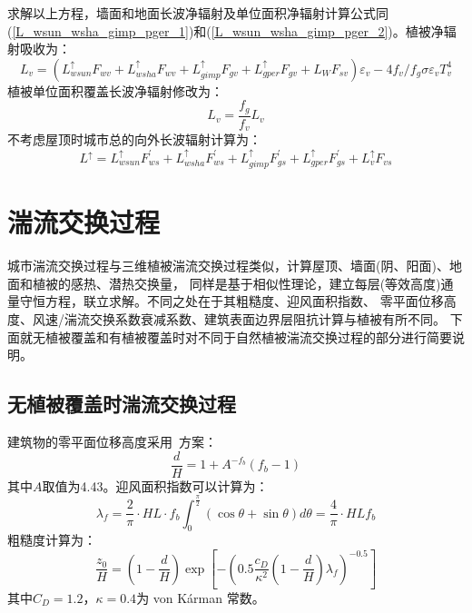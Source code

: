 求解以上方程，墙面和地面长波净辐射及单位面积净辐射计算公式同(\ref{L_wsun_wsha_gimp_pger_1})和(\ref{L_wsun_wsha_gimp_pger_2})。植被净辐射吸收为：
\begin{equation}
L_{v}=\left(L_{wsun}^{\uparrow} F_{w v}+L_{wsha}^{\uparrow} F_{w v}+L_{gimp}^{\uparrow} F_{g v}+L_{gper}^{\uparrow} F_{g v}+L_{W} F_{s v}\right) \varepsilon_{v}-4 f_{v} / f_{g} \sigma \varepsilon_{v} T_{v}^{4}
\end{equation}
植被单位面积覆盖长波净辐射修改为：
\begin{equation}
L_{v}=\frac{f_{g}}{f_{v}} L_{v}
\end{equation}
不考虑屋顶时城市总的向外长波辐射计算为：
\begin{equation}
L^{\uparrow}=L_{wsun}^{\uparrow} F_{ws}^{\prime}+L_{wsha}^{\uparrow} F_{ws}^{\prime}+L_{gimp}^{\uparrow} F_{gs}^{\prime}+L_{gper}^{\uparrow} F_{gs}^{\prime}+L_{v}^{\uparrow} F_{v s}
\end{equation}
\section{湍流交换过程}
城市湍流交换过程与三维植被湍流交换过程类似，计算屋顶、墙面(阴、阳面)、地面和植被的感热、潜热交换量，
同样是基于相似性理论，建立每层(等效高度)通量守恒方程，联立求解。不同之处在于其粗糙度、迎风面积指数、
零平面位移高度、风速/湍流交换系数衰减系数、建筑表面边界层阻抗计算与植被有所不同。
下面就无植被覆盖和有植被覆盖时对不同于自然植被湍流交换过程的部分进行简要说明。
\subsection{无植被覆盖时湍流交换过程}
建筑物的零平面位移高度采用~\citet{macdonald1998improved}方案：
\begin{equation}
\frac{d}{H}=1+A^{-f_{b}}\left(f_{b}-1\right)
\end{equation}
其中$A$取值为4.43。迎风面积指数可以计算为：
\begin{equation}
\lambda_{f}=\frac{2}{\pi} \cdot H L \cdot f_{b} \int_{0}^{\frac{\pi}{2}}(\cos \theta+\sin \theta) d \theta=\frac{4}{\pi} \cdot H L f_{b}
\end{equation}
粗糙度计算为：
\begin{equation}
\frac{z_{0}}{H}=\left(1-\frac{d}{H}\right) \exp \left[-\left(0.5 \frac{c_{D}}{\kappa^{2}}\left(1-\frac{d}{H}\right) \lambda_{f}\right)^{-0.5}\right]
\end{equation}
其中$C_D=1.2$，$\kappa=0.4$为 von K\'arman 常数。

